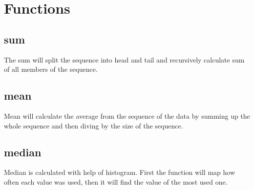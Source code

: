 \documentclass{article}
\begin{document}
\newpage
\section{Functions}

\subsection{sum}
\label{math:sum}
The sum will split the sequence into head and tail and recursively calculate sum of all members  of the sequence.

\subsection{mean}
\label{math:mean}
Mean will calculate the average from the sequence of the data by summing up the whole sequence and then diving by the size of the sequence.

\subsection{median}
\label{math:median}
Median is calculated with help of histogram. First the function will map how often each value was used, then it will find the value of the most used one.
\end{document}
